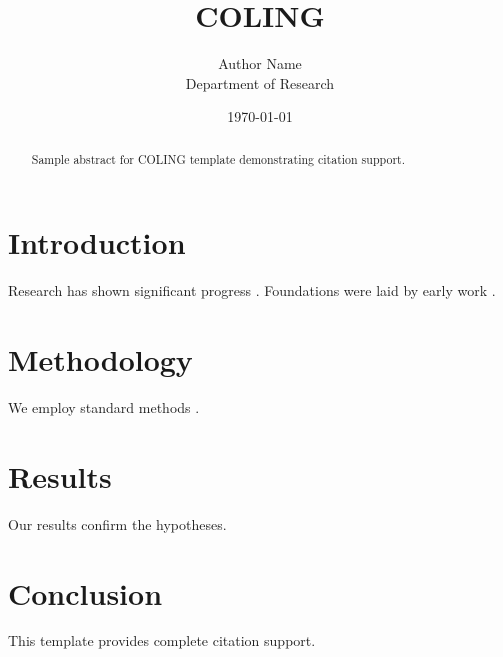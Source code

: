 \documentclass{article}
\title{COLING}
\author{Author Name \\ \small Department of Research}
\date{\today}
\begin{document}
\maketitle

\begin{abstract}
Sample abstract for COLING template demonstrating citation support.
\end{abstract}

\section{Introduction}
Research has shown significant progress \citep{einstein1905}. Foundations were laid by early work \citep{turing1950}.

\section{Methodology}
We employ standard methods \citep{knuth1984}.

\section{Results}
Our results confirm the hypotheses.

\section{Conclusion}
This template provides complete citation support.



\end{document}
